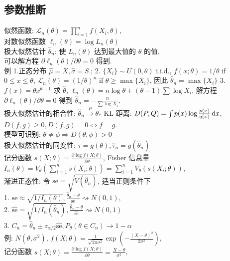 \documentclass[titlepage, a4paper, landscape]{article}
\begin{document}
\begin{multicols}{4}
\section{参数推断}
似然函数: $\mathcal{L}_n(\theta) = \prod_{i = 1}^n f(X_i, \theta)$,\\
对数似然函数 $\ell_n(\theta) = \log L_n(\theta)$\\
极大似然估计 $\hat \theta_n$: 使 $L_n(\theta)$ 达到最大值的 $\theta$ 的值,\\
可以解方程 $\partial \ell_n(\theta) / \partial \theta = 0$ 得到. \\
例 1.正态分布 $\hat \mu = \overline X, \hat \sigma = S.$;
2. $\{X_i\} \sim U(0, \theta)$ i.i.d.,
$f(x; \theta) = 1/\theta$ if $0\leq x\leq \theta$,
$\mathcal{L}_n(\theta) = (1/\theta)^n$ if $\theta \geq \max \{X_i\}$,
因此 $\hat \theta_n = \max \{X_i\}$
3. $f(x) = \theta x ^ {\theta - 1}$ 求 $\hat \theta$, $\ell_n(\theta) = n \log \theta + (\theta - 1) \sum \log X_i$, 
解方程 $\partial \ell_n(\theta) / \partial \theta = 0$ 得到
$\hat \theta_n = - \frac{n}{\sum \log X_i}$.\\
极大似然估计的相合性: $\hat \theta_n \xrightarrow{P} \theta_*$
KL 距离: $D(P, Q) = \int p(x) \log \frac{p(x)}{q(x)} \,\mathrm{d} x$, $D(f, g)\geq 0, D(f, g) = 0 \Leftrightarrow f = g$.\\
模型可识别: $\theta \neq \phi \Rightarrow D(\theta, \phi) > 0$\\
极大似然估计的同变性: $\tau = g(\theta), \hat \tau_n = g(\hat \theta_n)$\\
记分函数 $s(X; \theta) = \frac {\partial \log f(X; \theta)} {\partial \theta}$,
Fisher 信息量 $I_n(\theta) = V_\theta\left( \sum_{i=1}^n s(X_i; \theta) \right) = \sum_{i = 1}^n V_\theta(s(X_i; \theta))$,\\
渐进正态性: 令 $\mathrm{se} = \sqrt{V(\hat \theta_n)}$, 适当正则条件下 \\
1. $\mathrm{se} \approx \sqrt{1 / I_n(\theta)}, \frac{\hat \theta_n - \theta}{\mathrm{se}} \rightsquigarrow N(0, 1)$, \\
2. $\hat {\mathrm{se}} = \sqrt{1 / I_n(\hat \theta_n)}, \frac{\hat \theta_n - \theta}{\hat {\mathrm{se}}} \rightsquigarrow N(0, 1)$\\
3. $C_n = \hat \theta_n \pm z_{\alpha/2} \hat {\mathrm{se}}, P_\theta(\theta \in C_n) \rightarrow 1 - \alpha$\\
例: $N(\theta, \sigma ^ 2)$,
$f(X; \theta) = \frac{1}{\sqrt{2\pi\sigma^2}} \exp \left( - \frac{(X - \theta)^2}{2\sigma^2} \right)$,\\
记分函数 $s(X; \theta) = \frac{\partial \log f(X; \theta)}{\partial \theta} = \frac{X - \theta}{\sigma^2}$,

\end{multicols}
\end{document}
